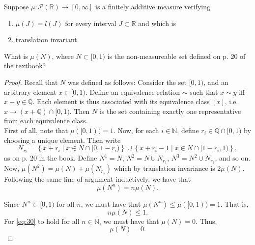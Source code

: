 \documentclass[12pt]{article}
\newenvironment{problem}[2][Problem]{\begin{trivlist}
    \item[\hskip \labelsep {\bfseries #1}\hskip \labelsep {\bfseries #2.}]}{\end{trivlist}}
\theoremstyle{definition}
\begin{document}
\begin{problem}{5}
  Suppose \(\mu: \mathcal{P}(\mathbb{R}) \rightarrow [0, \infty]\) is a finitely additive measure verifying
  \begin{enumerate}
    \item \(\mu(J) = l(J)\) for every interval \( J \subset \mathbb{R} \) and which is
    \item translation invariant.
  \end{enumerate}
  What is \(\mu(N)\), where \( N \subset [0,1) \) is the non-measureable set defined on p. 20 of the textbook?
\end{problem}
\begin{proof}
  Recall that \( N \) was defined as follows:
  Consider the set \( [0, 1) \), and an arbitrary element \( x \in [0,1) \).
  Define an equivalence relation \( \sim \) such that \( x \sim y  \) iff \( x - y \in \mathbb{Q} \).
  Each element is thus associated with its equivalence class \( [x] \), i.e. \(x \rightarrow (x + \mathbb{Q}) \cap [0,1) \).
  Then \( N \) is the set containing exactly one representative from each equivalence class.\\

  First of all, note that \( \mu([0,1)) = 1 \).
  Now, for each \( i \in \mathbb{N} \), define \( r_{i} \in \mathbb{Q} \cap [0,1) \) by choosing a unique element.
  Then write
  \begin{equation}
  \label{eq:29}
  N_{r_i} = \left\{ x + r_i \mid x \in N \cap [0,1-r_i) \right\} \cup \left\{ x + r_{i} - 1 \mid x \in N \cap [1-r_{i}, 1) \right\},
  \end{equation}
  as on p. 20 in the book.
  Define \( N^1 = N \), \( N^2 = N \cup N_{r_1} \), \( N^3 = N^2 \cup N_{r_{2}}\), and so on.
  Now, \( \mu(N^2) = \mu(N) + \mu(N_{r_1}) \) which by translation invariance is \(2\mu(N)\).
  Following the same line of argument inductively, we have that
  \begin{equation}
  \mu(N^n) = n\mu(N).
  \end{equation}

  Since \( N^{n} \subset [0,1) \) for all \( n \), we must have that \( \mu(N^n) \leq \mu([0,1)) = 1\).
  That is,
  \begin{equation}
  \label{eq:30}
  n\mu(N) \leq 1.
  \end{equation}
  For \cref{eq:30} to hold for all \( n \in \mathbb{N} \), we must have that \(\mu(N) = 0\).
  Thus,
  \begin{equation}
  \label{eq:31}
  \mu(N) = 0.
  \end{equation}
\end{proof}
\end{document}
